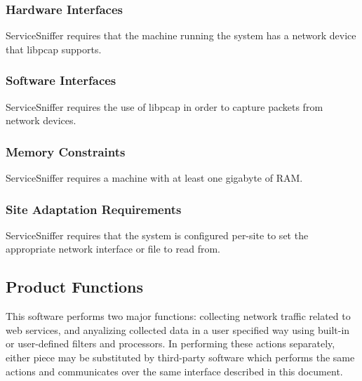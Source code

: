\documentclass[titlepage]{article}
\begin{document}

\subsubsection{Hardware Interfaces%
  \label{hardware-interfaces}%
}

ServiceSniffer requires that the machine running the system has a network
device that libpcap supports.


\subsubsection{Software Interfaces%
  \label{software-interfaces}%
}

ServiceSniffer requires the use of libpcap in order to capture packets from
network devices.


\subsubsection{Memory Constraints%
  \label{memory-constraints}%
}

ServiceSniffer requires a machine with at least one gigabyte of RAM.


\subsubsection{Site Adaptation Requirements%
  \label{site-adaptation-requirements}%
}

ServiceSniffer requires that the system is configured per-site to set the
appropriate network interface or file to read from.


\subsection{Product Functions%
  \label{product-functions}%
}

This software performs two major functions: collecting network traffic related
to web services, and anyalizing collected data in a user specified
way using built-in or user-defined filters and processors.  In performing these
actions separately, either piece may be substituted by third-party software
which performs the same actions and communicates over the same interface
described in this document.  
\end{document}

